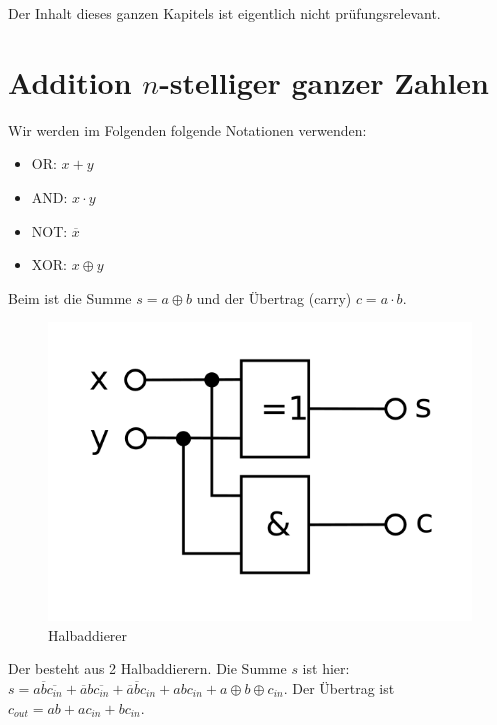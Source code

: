 \begin{*anmerkung}
	Der Inhalt dieses ganzen Kapitels ist eigentlich nicht prüfungsrelevant.
\end{*anmerkung}

\section{Addition $n$-stelliger ganzer Zahlen}

Wir werden im Folgenden folgende Notationen verwenden:
\begin{itemize}
	\item OR: $x+y$
	\item AND: $x\cdot y$
	\item NOT: $\overline{x}$
	\item XOR: $x\oplus y$
\end{itemize}

Beim  ist die Summe $s=a\oplus b$ und der Übertrag (carry) $c=a\cdot b$.

\begin{figure}[ht]
	\centering
	\includegraphics{images/Halbaddierer.png}
	\caption{Halbaddierer}
\end{figure}

Der  besteht aus 2 Halbaddierern. Die Summe $s$ ist hier: $s=a\overline{b}\overline{c_{in}}+\overline{a}b\overline{c_{in}}+\overline{a}\overline{b}c_{in}+abc_{in}+a\oplus b\oplus c_{in}$. Der Übertrag ist $c_{out}=ab+ac_{in}+bc_{in}$.

